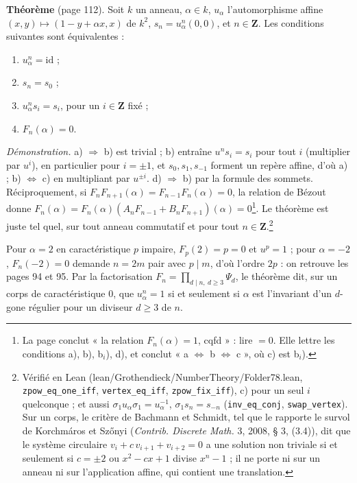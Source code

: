 \documentclass[11pt,a4paper]{article}
\begin{document}
\textbf{Théorème} (page 112). Soit $k$ un anneau, $\alpha \in k$, $u_\alpha$
l'automorphisme affine $(x, y) \mapsto (1 - y + \alpha x, x)$ de $k^2$, $s_n =
u_\alpha^n(0, 0)$, et $n \in \mathbf{Z}$. Les conditions suivantes sont
équivalentes :
\begin{enumerate}
  \item[a)] $u_\alpha^n = \mathrm{id}$ ;
  \item[b)] $s_n = s_0$ ;
  \item[c)] $u_\alpha^n s_i = s_i$, pour un $i \in \mathbf{Z}$ fixé ;
  \item[d)] $F_n(\alpha) = 0$.
\end{enumerate}
\emph{Démonstration.} a) $\Rightarrow$ b) est trivial ; b) entraîne $u^n s_i =
s_i$ pour tout $i$ (multiplier par $u^i$), en particulier pour $i = \pm 1$, et
$s_0, s_1, s_{-1}$ forment un repère affine, d'où a) ; b) $\Leftrightarrow$ c)
en multipliant par $u^{\pm i}$. d) $\Rightarrow$ b) par la formule des sommets.
Réciproquement, si $F_n F_{n+1}(\alpha) = F_{n-1} F_n(\alpha) = 0$, la
relation de Bézout donne $F_n(\alpha) = F_n(\alpha)(A_n F_{n-1} + B_n
F_{n+1})(\alpha) = 0$\footnote{La page conclut « la relation $F_n(\alpha) =
1$, cqfd » : lire $= 0$. Elle lettre les conditions a), b), b$_i$), d), et
conclut « a $\iff$ b $\iff$ c », où c) est b$_i$).}. Le théorème est juste
tel quel, sur tout anneau commutatif et pour tout
$n \in \mathbf{Z}$.\footnote{Vérifié en Lean (lean/Grothendieck/NumberTheory/Folder78.lean,
\texttt{zpow\_eq\_one\_iff}, \texttt{vertex\_eq\_iff}, \texttt{zpow\_fix\_iff}),
c) pour un seul $i$ quelconque ; et aussi $\sigma_1 u_\alpha \sigma_1 =
u_\alpha^{-1}$, $\sigma_1 s_n = s_{-n}$ (\texttt{inv\_eq\_conj},
\texttt{swap\_vertex}). Sur un corps, le critère de Bachmann et Schmidt, tel
que le rapporte le survol de Korchmáros et Szőnyi (\emph{Contrib. Discrete
Math.} 3, 2008, § 3, (3.4)), dit que le système circulaire $v_i + c\,v_{i+1}
+ v_{i+2} = 0$ a une solution non triviale si et seulement si $c = \pm 2$ ou
$x^{2} - cx + 1$ divise $x^{n} - 1$ ; il ne porte ni sur un anneau ni sur
l'application affine, qui contient une translation.}

Pour $\alpha = 2$ en caractéristique $p$ impaire, $F_p(2) = p = 0$ et
$u^p = 1$ ; pour $\alpha = -2$, $F_n(-2) = 0$ demande $n = 2m$ pair avec $p
\mid m$, d'où l'ordre $2p$ : on retrouve les pages 94 et 95. Par la
factorisation $F_n = \prod_{d \mid n,\ d \geq 3} \Psi_d$, le théorème dit, sur
un corps de caractéristique $0$, que $u_\alpha^n = 1$ si et seulement si
$\alpha$ est l'invariant d'un $d$-gone régulier pour un diviseur $d \geq 3$ de
$n$.
\end{document}
